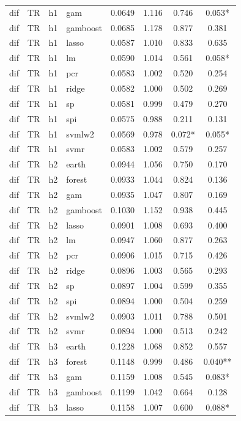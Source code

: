 \begin{ThreePartTable}
\begin{longtable}[t]{llclcccc}
dif & TR & h1 & gam & 0.0649 & 1.116 & 0.746 & 0.053*\\
dif & TR & h1 & gamboost & 0.0685 & 1.178 & 0.877 & 0.381\\
dif & TR & h1 & lasso & 0.0587 & 1.010 & 0.833 & 0.635\\
dif & TR & h1 & lm & 0.0590 & 1.014 & 0.561 & 0.058*\\
dif & TR & h1 & pcr & 0.0583 & 1.002 & 0.520 & 0.254\\
dif & TR & h1 & ridge & 0.0582 & 1.000 & 0.502 & 0.269\\
dif & TR & h1 & sp & 0.0581 & 0.999 & 0.479 & 0.270\\
dif & TR & h1 & spi & 0.0575 & 0.988 & 0.211 & 0.131\\
dif & TR & h1 & svmlw2 & 0.0569 & 0.978 & 0.072* & 0.055*\\
dif & TR & h1 & svmr & 0.0583 & 1.002 & 0.579 & 0.257\\
\addlinespace
dif & TR & h2 & earth & 0.0944 & 1.056 & 0.750 & 0.170\\
dif & TR & h2 & forest & 0.0933 & 1.044 & 0.824 & 0.136\\
dif & TR & h2 & gam & 0.0935 & 1.047 & 0.807 & 0.169\\
dif & TR & h2 & gamboost & 0.1030 & 1.152 & 0.938 & 0.445\\
dif & TR & h2 & lasso & 0.0901 & 1.008 & 0.693 & 0.400\\
dif & TR & h2 & lm & 0.0947 & 1.060 & 0.877 & 0.263\\
dif & TR & h2 & pcr & 0.0906 & 1.015 & 0.715 & 0.426\\
dif & TR & h2 & ridge & 0.0896 & 1.003 & 0.565 & 0.293\\
dif & TR & h2 & sp & 0.0897 & 1.004 & 0.599 & 0.355\\
dif & TR & h2 & spi & 0.0894 & 1.000 & 0.504 & 0.259\\
dif & TR & h2 & svmlw2 & 0.0903 & 1.011 & 0.788 & 0.501\\
dif & TR & h2 & svmr & 0.0894 & 1.000 & 0.513 & 0.242\\
\addlinespace
dif & TR & h3 & earth & 0.1228 & 1.068 & 0.852 & 0.557\\
dif & TR & h3 & forest & 0.1148 & 0.999 & 0.486 & 0.040**\\
dif & TR & h3 & gam & 0.1159 & 1.008 & 0.545 & 0.083*\\
dif & TR & h3 & gamboost & 0.1199 & 1.042 & 0.664 & 0.128\\
dif & TR & h3 & lasso & 0.1158 & 1.007 & 0.600 & 0.088*\\

\end{longtable}
\end{ThreePartTable}
